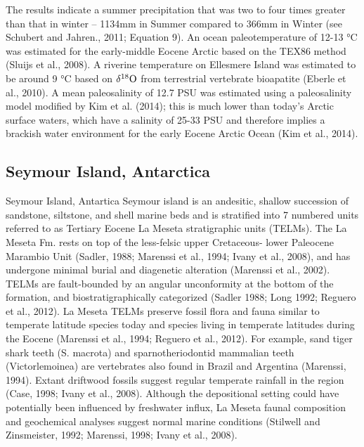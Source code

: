 \documentclass[]{rsos}%
\begin{document}
The results indicate a summer precipitation that was two to four times greater than that in winter – 1134mm in Summer compared to 366mm in Winter (see Schubert and Jahren., 2011; Equation 9). 
An ocean paleotemperature of 12-13 °C was estimated for the early-middle Eocene Arctic based on the TEX86 method (Sluijs et al., 2008). 
A riverine temperature on Ellesmere Island was estimated to be around 9 °C based on $\delta^{18}{\rm O}$ from terrestrial vertebrate bioapatite (Eberle et al., 2010). 
A mean paleosalinity of 12.7 PSU was estimated using a paleosalinity model modified by Kim et al. (2014); this is much lower than today’s Arctic surface waters, which have a salinity of 25-33 PSU and therefore implies a brackish water environment for the early Eocene Arctic Ocean (Kim et al., 2014).

\subsection{Seymour Island, Antarctica}
Seymour Island, Antartica
Seymour island is an andesitic, shallow succession of sandstone, siltstone, and shell marine beds and is stratified into 7 numbered units referred to as Tertiary Eocene La Meseta stratigraphic units (TELMs).
The La Meseta Fm. rests on top of the less-felsic upper Cretaceous- lower Paleocene Marambio Unit (Sadler, 1988; Marenssi et al., 1994; Ivany et al., 2008), and has undergone minimal burial and diagenetic alteration (Marenssi et al., 2002).  
TELMs are fault-bounded by an angular unconformity at the bottom of the formation, and biostratigraphically categorized (Sadler 1988; Long 1992; Reguero et al., 2012). 
La Meseta TELMs preserve fossil flora and fauna similar to temperate latitude species today and species living in temperate latitudes during the Eocene (Marenssi et al., 1994; Reguero et al., 2012). 
For example, sand tiger shark teeth (S. macrota) and sparnotheriodontid mammalian teeth (Victorlemoinea) are vertebrates also found in Brazil and Argentina (Marenssi, 1994).
Extant driftwood fossils suggest regular temperate rainfall in the region (Case, 1998; Ivany et al., 2008). 
Although the depositional setting could have potentially been influenced by freshwater influx, La Meseta faunal composition and geochemical analyses suggest normal marine conditions (Stilwell and Zinsmeister, 1992; Marenssi, 1998; Ivany et al., 2008).
\end{document}
